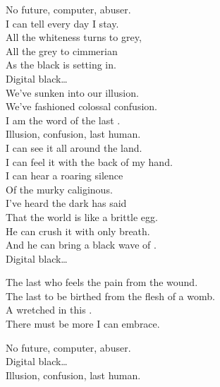 No future, computer, abuser. \\

I can tell every day I stay. \\
All the whiteness turns to grey, \\
All the grey to cimmerian \\
As the black is setting in. \\

Digital black… \\

We've sunken into our illusion. \\
We've fashioned colossal confusion. \\
I am the word of the last . \\

Illusion, confusion, last human. \\

I can see it all around the land. \\
I can feel it with the back of my hand. \\
I can hear a roaring silence \\
Of the murky caliginous. \\

I've heard the dark  has said \\
That the world is like a brittle egg. \\
He can crush it with only breath. \\
And he can bring a black wave of . \\

Digital black… \\


The last who feels the pain from the wound. \\
The last to be birthed from the flesh of a womb. \\

A wretched  in this . \\
There must be more I can embrace. \\


No future, computer, abuser. \\

Digital black… \\

Illusion, confusion, last human. \\

